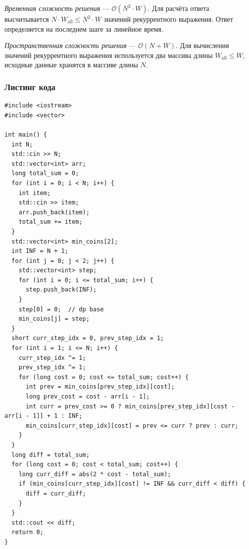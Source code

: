 \textit{Временная сложность решения} --- \( \mathcal{O}(N^2\cdot W) \). Для расчёта ответа высчитывается \( N\cdot W_{\text{all}}\leq N^2\cdot W \) значений рекуррентного выражения. Ответ определяется на последнем шаге за линейное время.

\textit{Пространственная сложность решения} --- \( \mathcal{O}(N+W) \). Для вычисления значений рекуррентного выражения используется два массива длины \( W_{\text{all}}\leq W \), исходные данные хранятся в массиве длины \( N \).

\subsubsection{Листинг кода}

\begin{lstlisting}
#include <iostream>
#include <vector>

int main() {
  int N;
  std::cin >> N;
  std::vector<int> arr;
  long total_sum = 0;
  for (int i = 0; i < N; i++) {
    int item;
    std::cin >> item;
    arr.push_back(item);
    total_sum += item;
  }
  std::vector<int> min_coins[2];
  int INF = N + 1;
  for (int j = 0; j < 2; j++) {
    std::vector<int> step;
    for (int i = 0; i <= total_sum; i++) {
      step.push_back(INF);
    }
    step[0] = 0;  // dp base
    min_coins[j] = step;
  }
  short curr_step_idx = 0, prev_step_idx = 1;
  for (int i = 1; i <= N; i++) {
    curr_step_idx ^= 1;
    prev_step_idx ^= 1;
    for (long cost = 0; cost <= total_sum; cost++) {
      int prev = min_coins[prev_step_idx][cost];
      long prev_cost = cost - arr[i - 1];
      int curr = prev_cost >= 0 ? min_coins[prev_step_idx][cost - arr[i - 1]] + 1 : INF;
      min_coins[curr_step_idx][cost] = prev <= curr ? prev : curr;
    }
  }
  long diff = total_sum;
  for (long cost = 0; cost < total_sum; cost++) {
    long curr_diff = abs(2 * cost - total_sum);
    if (min_coins[curr_step_idx][cost] != INF && curr_diff < diff) {
      diff = curr_diff;
    }
  }
  std::cout << diff;
  return 0;
}
\end{lstlisting}
